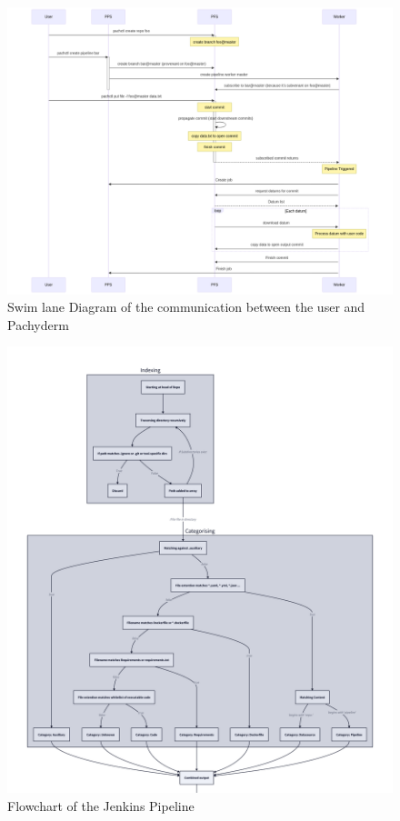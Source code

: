 \begin{figure}[H]
  \centering
  \includegraphics[width=14cm]{graphics/pipeline_communication_sld.png}
  \caption[Swim lane Diagram of the communication between the user and Pachyderm]{Swim lane Diagram of the communication between the user and Pachyderm\footnotemark}
  \label{abb:pipeline_communication_sld}
\end{figure}


\newpage
{}


\begin{figure}[H]
  \centering
  \includegraphics[width=16cm]{graphics/flowchart_pipeline_upper.png}
  \caption{Flowchart of the Jenkins Pipeline}
  \label{abb:flowchart_pipeline_upper}
\end{figure}


